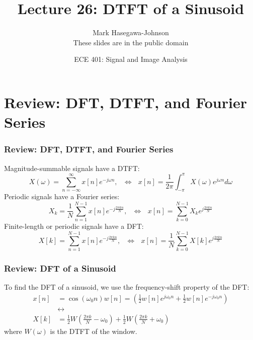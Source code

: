 \documentclass{beamer}
\title{Lecture 26: DTFT of a Sinusoid}
\author{Mark Hasegawa-Johnson\\These slides are in the public domain}
\date{ECE 401: Signal and Image Analysis}
\begin{document}
\begin{frame}
  \maketitle
\end{frame}

\begin{frame}
  \tableofcontents
\end{frame}

\section[Review]{Review: DFT, DTFT, and Fourier Series}
\setcounter{subsection}{1}

\begin{frame}
  \frametitle{Review: DFT, DTFT, and Fourier Series}

  Magnitude-summable signals have a DTFT:
  \begin{displaymath}
    X(\omega) = \sum_{n=-\infty}^\infty x[n]e^{-j\omega n},~~~\Leftrightarrow~~~
    x[n] = \frac{1}{2\pi}\int_{-\pi}^\pi X(\omega)e^{j\omega n}d\omega
  \end{displaymath}
  Periodic signals have a Fourier series:
  \begin{displaymath}
    X_k = \frac{1}{N}\sum_{n=1}^{N-1} x[n]e^{-j\frac{2\pi kn}{N}},~~~\Leftrightarrow~~~
    x[n] = \sum_{k=0}^{N-1} X_k e^{j\frac{2\pi kn}{N}}
  \end{displaymath}
  Finite-length or periodic signals have a DFT:
  \begin{displaymath}
    X[k] = \sum_{n=1}^{N-1} x[n]e^{-j\frac{2\pi kn}{N}},~~~\Leftrightarrow~~~
    x[n] = \frac{1}{N}\sum_{k=0}^{N-1} X[k] e^{j\frac{2\pi kn}{N}}
  \end{displaymath}
\end{frame}

\begin{frame}
  \frametitle{Review: DFT of a Sinusoid}

  To find the DFT of a sinusoid, we use the frequency-shift property
  of the DFT:
  \begin{align*}
    x[n]&=\cos(\omega_0 n)w[n] = 
    \left(\frac{1}{2}w[n]e^{j\omega_0 n}+\frac{1}{2}w[n]e^{-j\omega_0 n}\right)\\
    &\leftrightarrow\\
    X[k] &= \frac{1}{2}W\left(\frac{2\pi k}{N}-\omega_0\right) +
    \frac{1}{2}W\left(\frac{2\pi k}{N}+\omega_0\right)
  \end{align*}
  where $W(\omega)$ is the DTFT of the window.
\end{frame}
\end{document}
